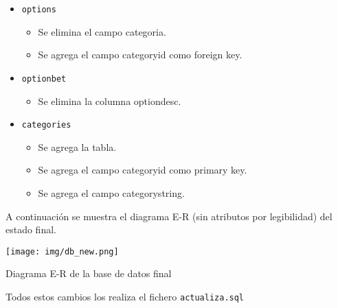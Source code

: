 \documentclass{article}
\begin{document}
\begin{itemize}
\begin{itemize}
        \end{itemize}
    \item\texttt{options}
        \begin{itemize}
            \item Se elimina el campo categoria.
            \item Se agrega el campo categoryid como foreign key.
        \end{itemize}
    \item\texttt{optionbet}
        \begin{itemize}
            \item Se elimina la columna optiondesc.
        \end{itemize}
    \item\texttt{categories}
        \begin{itemize}
            \item Se agrega la tabla.
            \item Se agrega el campo categoryid como primary key.
            \item Se agrega el campo categorystring.
        \end{itemize}
\end{itemize}
\newpage
A continuación se muestra el diagrama E-R (sin atributos por legibilidad) del estado final.
\smallbreak
\begin{minipage}{\linewidth}
    \centering
    \captionsetup{type=figure}
    \texttt{[image: img/db\_new.png]}
    \caption{Diagrama E-R de la base de datos final}
    \label{fig:fig2}
\end{minipage}

Todos estos cambios los realiza el fichero \texttt{actualiza.sql}
\end{document}

